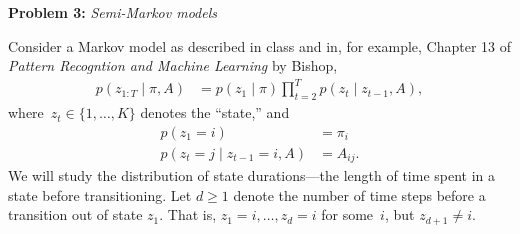 \documentclass[11pt]{article}
\begin{document}
\clearpage

\textbf{Problem 3:} \textit{Semi-Markov models}

Consider a Markov model as described in class and in, for example, Chapter 13 of \textit{Pattern Recogntion and Machine Learning} by Bishop,
\begin{align*}
    p(z_{1:T} \mid \pi, A) &= p(z_1 \mid \pi) \prod_{t=2}^T p(z_t \mid z_{t-1}, A),
\end{align*}
where~$z_t \in \{1, \ldots, K\}$ denotes the ``state,'' and
\begin{align*}
    p(z_1 = i) &= \pi_i \\
    p(z_t = j \mid z_{t-1} = i, A) &= A_{ij}.
\end{align*}
We will study the distribution of state durations---the length of time spent in a state before transitioning.  Let $d \geq 1$ denote the number of time steps before a transition out of state $z_1$.  That is, $z_1 = i, \ldots, z_{d}=i$ for some~$i$, but $z_{d+1} \neq i$.
\end{document}
